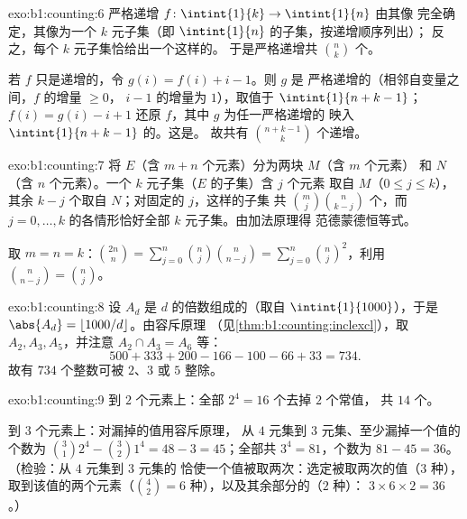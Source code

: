 \begin{solution}{exo:b1:counting:6}
严格递增 $f \colon \intint{1}{k} \to \intint{1}{n}$ 由其像
完全确定，其像为一个 $k$ 元子集（即 $\intint{1}{n}$ 的子集，按递增顺序列出）；
反之，每个 $k$ 元子集恰给出一个这样的。
于是严格递增共 $\binom nk$ 个。

若 $f$ 只是递增的，令 $g(i) = f(i) + i - 1$。则 $g$ 是
严格递增的（相邻自变量之间，$f$ 的增量 $\geq 0$，
$i - 1$ 的增量为 $1$），取值于 $\intint{1}{n + k - 1}$；
$f(i) = g(i) - i + 1$ 还原 $f$，其中 $g$ 为任一严格递增的
映入 $\intint{1}{n+k-1}$ 的。这是。
故共有 $\binom{n + k - 1}{k}$ 个递增。
\end{solution}

\begin{solution}{exo:b1:counting:7}
将 $E$（含 $m + n$ 个元素）分为两块 $M$（含 $m$ 个元素）
和 $N$（含 $n$ 个元素）。一个 $k$ 元子集（$E$ 的子集）含 $j$ 个元素
取自 $M$（$0 \leq j \leq k$），其余 $k - j$ 个取自 $N$；对固定的 $j$，这样的子集
共 $\binom mj \binom{n}{k-j}$ 个，而 $j = 0, \dots,
k$ 的各情形恰好全部 $k$ 元子集。由加法原理得
范德蒙德恒等式。

取 $m = n = k$：$\binom{2n}{n} = \sum_{j=0}^{n} \binom nj
\binom{n}{n-j} = \sum_{j=0}^{n} \binom nj^2$，利用 $\binom{n}{n-j} =
\binom nj$。
\end{solution}

\begin{solution}{exo:b1:counting:8}
设 $A_d$ 是 $d$ 的倍数组成的（取自 $\intint{1}{1000}$），于是
$\abs{A_d} = \lfloor 1000/d \rfloor$。由容斥原理
（见\cref{thm:b1:counting:inclexcl}），取 $A_2, A_3, A_5$，并注意
$A_2 \cap A_3 = A_6$ 等：
\[
500 + 333 + 200 - 166 - 100 - 66 + 33 = 734 .
\]
故有 $734$ 个整数可被 $2$、$3$ 或 $5$ 整除。
\end{solution}

\begin{solution}{exo:b1:counting:9}
到 $2$ 个元素上：全部 $2^4 = 16$ 个去掉 $2$ 个常值，
共 $14$ 个。

到 $3$ 个元素上：对漏掉的值用容斥原理，
从 $4$ 元集到 $3$ 元集、至少漏掉一个值的个数为
$\binom 31 2^4 - \binom 32 1^4 = 48 - 3 = 45$；全部共 $3^4 =
81$，个数为 $81 - 45 = 36$。（检验：从 $4$ 元集到 $3$ 元集的
恰使一个值被取两次：选定被取两次的值（$3$ 种），
取到该值的两个元素（$\binom 42 = 6$ 种），以及其余部分的（$2$ 种）：
$3 \times 6 \times 2 = 36$。）
\end{solution}

